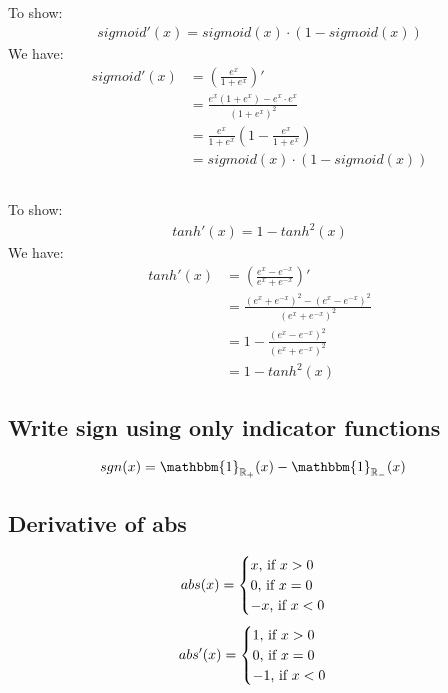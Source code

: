 \documentclass[12pt]{article}
\begin{document}
\subsection{}
To show:
\begin{align*}
sigmoid'(x) = sigmoid(x) \cdot (1-sigmoid(x))
\end{align*}
We have:
\begin{align*}
sigmoid'(x) & = (\frac{e^x}{1+e^x})' \\
& =  \frac{e^x(1+e^x)-e^x \cdot e^x}{(1+e^x)^2} \\
& = \frac{e^x}{1+e^x} (1-\frac{e^x}{1+e^x}) \\
& = sigmoid(x) \cdot (1-sigmoid(x))
\end{align*}
\subsection{}
To show:
\begin{align*}
tanh'(x) = 1-tanh^2(x)
\end{align*}
We have:
\begin{align*}
tanh'(x) & = (\frac{e^x-e^{-x}}{e^x+e^{-x}})' \\
& = \frac{(e^x+e^{-x})^2-(e^x-e^{-x})^2}{(e^x+e^{-x})^2} \\
& = 1 - \frac{(e^x-e^{-x})^2}{(e^x+e^{-x})^2} \\
& = 1 -tanh^2(x)
\end{align*}
\subsection{Write sign using only indicator functions}
\begin{align*}
sgn(x) & = \mathbbm{1}_\mathbb{R_+}(x) - \mathbbm{1}_\mathbb{R_-}(x)
\end{align*}
\subsection{Derivative of abs}
\begin{align*}
abs(x)=\begin{cases}
               x$, if $ x > 0 \\
               0 $, if $ x = 0 \\
               -x$, if $ x < 0 \\
            \end{cases}
\end{align*}
\begin{align*}
abs'(x)=\begin{cases}
               1$, if $ x > 0 \\
               0 $, if $ x = 0 \\
               -1$, if $ x < 0 \\
            \end{cases}
\end{align*}
\end{document}
